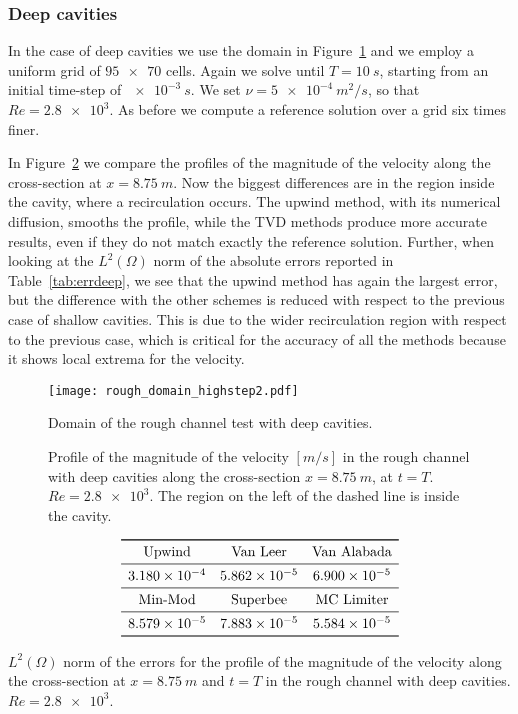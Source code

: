 \subsubsection{Deep cavities}
In the case of deep cavities we use the domain in Figure~\ref{fig:roughdomdeep} 
and we employ a uniform grid of $\num{95x70}$ cells. Again we solve until 
$T=\SI{10}{s}$, starting from an initial time-step of $\SI{e-3}{s}$. We set 
$\nu=\SI{5e-4}{m^2/s}$, so that $Re=\num{2.8e3}$. As before we compute a 
reference solution over a grid six times finer.

In Figure~\ref{fig:linecompdeep} we compare the profiles of the magnitude of 
the velocity along the cross-section at $x=\SI{8.75}{m}$. Now the biggest 
differences 
are in the region inside the cavity, where a recirculation occurs. The upwind 
method, with its numerical diffusion, smooths the profile, while the TVD 
methods produce more accurate results, even if they do not match exactly the 
reference solution.
Further, when looking at the $L^2(\Omega)$ norm of the absolute errors reported in 
Table~\ref{tab:errdeep}, we see that the upwind method has again the largest error, 
but the difference with the other schemes is reduced with respect to the 
previous case of shallow cavities. This is due to the wider recirculation region with respect to the previous case, which is critical for the accuracy of all the methods because it shows local extrema for the velocity.
\begin{figure}
	\centering
	\texttt{[image: rough\_domain\_highstep2.pdf]}
	\caption[Domain of the rough channel test with deep cavities]{Domain of the 
	rough channel test with deep cavities.}
	\label{fig:roughdomdeep}
\end{figure}
\begin{figure}
	\centering
	
	\caption[Profile of the magnitude of the velocity in the rough channel with 
	deep cavities at $Re=\num{2.8e3}$]{Profile of the magnitude of the velocity 
		$[\si{m/s}]$ in the rough channel with deep cavities along the 
		cross-section 
		$x=\SI{8.75}{m}$, at $t=T$. $Re=\num{2.8e3}$. The region on 
		the 
		left of the dashed line is inside the cavity.}
	\label{fig:linecompdeep}
\end{figure}
\begin{table}
	\centering
	\[
	\begin{array}{ccc}
	\toprule
	\text{Upwind} & \text{Van Leer} & \text{Van Alabada}\\
	\midrule
	\num{3.180e-4} & \num{5.862e-5} & \num{6.900e-5}\\
	\midrule
	\text{Min-Mod} & \text{Superbee} & \text{MC Limiter} \\
	\midrule
	\num{8.579e-5} & \num{7.883e-5} & \num{5.584e-5}\\
	\bottomrule
	\end{array}
	\]
	\caption[$L^2(\Omega)$ norm of the errors for the profile of the magnitude 
	of the 
	velocity in 
	the rough channel with deep cavities]{$L^2(\Omega)$ norm of the errors for 
	the profile 
	of the 
	magnitude of the velocity along the cross-section at $x=\SI{8.75}{m}$ and 
	$t=T$ in the rough channel with deep cavities. $Re = \num{2.8e3}$.}
	\label{tab:errdeep}
\end{table}
%
